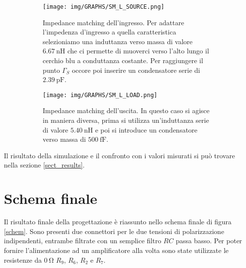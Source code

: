 \documentclass[12pt,oneside]{book}
\begin{document}
\begin{figure}[!htbp]
    \centering
    \begin{subfigure}[t]{0.48\textwidth}
        \centering
        \texttt{[image: img/GRAPHS/SM\_L\_SOURCE.png]}
        \caption{Impedance matching dell'ingresso. Per adattare l'impedenza d'ingresso a quella caratteristica selezioniamo una induttanza verso massa di valore $\SI{6.67}{\nano\henry}$ che ci permette di muoverci verso l'alto lungo il cerchio blu a conduttanza costante. Per raggiungere il punto $\Gamma_{S}$ occore poi inserire un condensatore serie di $\SI{2.39}{\pico\farad}$.}
    \end{subfigure}
    \hfill
    \begin{subfigure}[t]{0.48\textwidth}
        \centering
        \texttt{[image: img/GRAPHS/SM\_L\_LOAD.png]}
        \caption{Impedance matching dell'uscita. In questo caso si agisce in maniera diversa, prima si utilizza un'induttanza serie di valore $\SI{5.40}{\nano\henry}$ e poi si introduce un condensatore verso massa di $\SI{500}{\femto\farad}$.}
    \end{subfigure}
    \caption{}
\end{figure}

Il risultato della simulazione e il confronto con i valori misurati si può trovare nella sezione \ref{sect_results}.
\section{Schema finale}
Il risultato finale della progettazione è riassunto nello schema finale di figura \ref{schem}. Sono presenti due connettori per le due tensioni di polarizzazione indipendenti, entrambe filtrate con un semplice filtro $RC$ passa basso. Per poter fornire l'alimentazione ad un amplificatore alla volta sono state utilizzate le resistenze da $\SI{0}{\ohm}$ $R_{9}$, $R_{6}$, $R_{2}$ e $R_{7}$.
\end{document}
